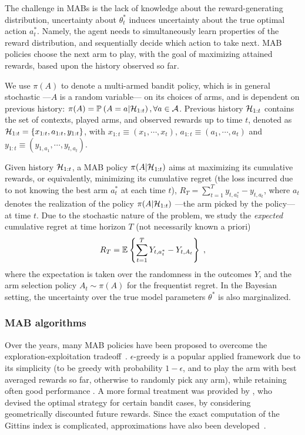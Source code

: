 The challenge in MABs is the lack of knowledge about the reward-generating distribution,
\ie uncertainty about $\theta_t^*$ induces uncertainty about the true optimal action $a_t^*$.
Namely, the agent needs to simultaneously learn properties of the reward distribution,
and sequentially decide which action to take next.
MAB policies choose the next arm to play,
with the goal of maximizing attained rewards, based upon the history observed so far.

We use $\pi(A)$ to denote a multi-armed bandit policy,
which is in general stochastic ---$A$ is a random variable--- on its choices of arms,
and is dependent on previous history:
$\pi(A)=\mathbb{P}_{}\left( A=a | \mathcal{H}_{1:t} \right), \forall a\in\mathcal{A}$.
Previous history $\mathcal{H}_{1:t}$ contains the set of contexts, played arms, and observed rewards up to time $t$,
denoted as $\mathcal{H}_{1:t}=\left\{x_{1:t}, a_{1:t}, y_{1:t}\right\}$,
with $x_{1:t} \equiv \left(x_1, \cdots , x_t\right)$,
$a_{1:t} \equiv \left(a_1, \cdots , a_t\right)$
and $y_{1:t} \equiv \left(y_{1,a_1}, \cdots , y_{t,a_t}\right)$.

Given history $\mathcal{H}_{1:t}$, a MAB policy $\pi(A|\mathcal{H}_{1:t})$ aims at maximizing its cumulative rewards,
or equivalently, 
minimizing its cumulative regret
(the loss incurred due to not knowing the best arm $a_t^*$ at each time $t$),
\ie $R_T=\sum_{t=1}^T y_{t,a^*_t}-y_{t,a_t}$,
where $a_t$ denotes the realization of the policy $\pi(A|\mathcal{H}_{1:t})$
---the arm picked by the policy--- at time $t$.
%
Due to the stochastic nature of the problem,
we study the \emph{expected} cumulative regret at time horizon $T$ (not necessarily known a priori)
\begin{equation}
R_T=\mathbb{E}_{}\left\{ \sum_{t=1}^T Y_{t,a^*_t}-Y_{t,A_t}  \right\} \; ,
\label{eq:mab_cumulative_regret}
\end{equation}
where the expectation is taken over the randomness in the outcomes $Y$, and the arm selection policy $A_t \sim \pi(A)$
for the frequentist regret.
In the Bayesian setting, the uncertainty over the true model parameters $\theta^*$ is also marginalized.

\subsubsection{MAB algorithms}
\label{sssec:mab_algos}
Over the years, many MAB policies have been proposed to overcome the exploration-exploitation tradeoff~\citep{b-Lattimore2020}.
$\epsilon$-greedy is a popular applied framework due to its simplicity
(\ie to be greedy with probability $1-\epsilon$,
and to play the arm with best averaged rewards so far,
otherwise to randomly pick any arm),
while retaining often good performance \citep{j-Auer2002}.
A more formal treatment was provided by
\citet{j-Gittins1979},
who devised the optimal strategy for certain bandit cases,
by considering geometrically discounted future rewards.
Since the exact computation of the Gittins index is complicated,
approximations have also been developed~\citep{j-Brezzi2002}.

